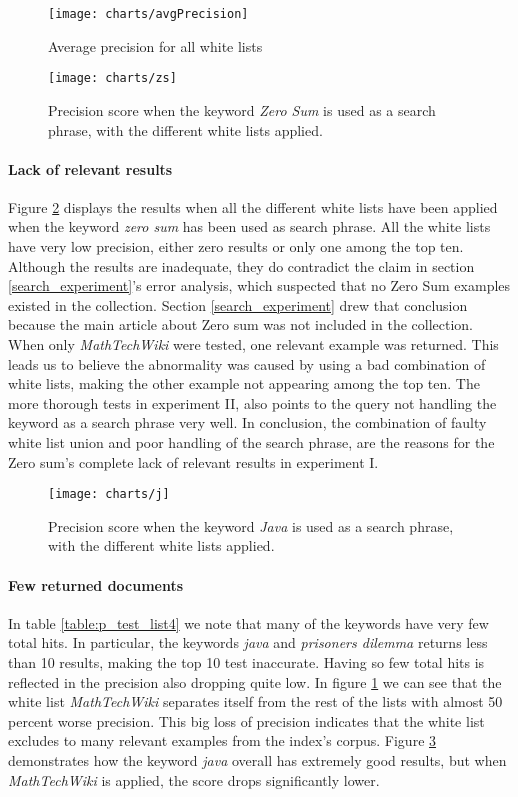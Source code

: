 \begin{figure}[H] 
\caption{Average precision for all white lists}
\texttt{[image: charts/avgPrecision]}
\label{fig:avgPrecision}
\end{figure}

\begin{figure}[h] 
\caption{Precision score when the keyword \textit{Zero Sum} is used as a search phrase, with the different white lists applied.}
\texttt{[image: charts/zs]}
\label{fig:zs}
\end{figure}

\paragraph{Lack of relevant results}
Figure \ref{fig:zs} displays the results when all the different white lists have been applied when the keyword \textit{zero sum} has been used as search phrase. All the white lists have very low precision, either zero results or only one among the top ten. Although the results are inadequate, they do contradict the claim in section \ref{search_experiment}'s error analysis, which suspected that no Zero Sum examples existed in the collection. Section \ref{search_experiment} drew that conclusion because the main article about Zero sum was not included in the collection. When only \textit{MathTechWiki} were tested, one relevant example was returned. This leads us to believe the abnormality was caused by using a bad combination of white lists, making the other example not appearing among the top ten. The more thorough tests in experiment II, also points to the query not handling the keyword as a search phrase very well. In conclusion, the combination of faulty white list union and poor handling of the search phrase, are the reasons for the Zero sum's complete lack of relevant results in experiment I.

\begin{figure}[h] 
\caption{Precision score when the keyword \textit{Java} is used as a search phrase, with the different white lists applied.}
\texttt{[image: charts/j]}
\label{fig:j}
\end{figure}

\paragraph{Few returned documents}
In table \ref{table:p_test_list4} we note that many of the keywords have very few total hits. In particular, the keywords \textit{java} and \textit{prisoners dilemma} returns less than 10 results, making the top 10 test inaccurate. Having so few total hits is reflected in the precision also dropping quite low. In figure \ref{fig:avgPrecision} we can see that the white list \textit{MathTechWiki} separates itself from the rest of the lists with almost 50 percent worse precision. This big loss of precision indicates that the white list excludes to many relevant examples from the index's corpus. Figure \ref{fig:j} demonstrates how the keyword \textit{java} overall has extremely good results, but when \textit{MathTechWiki} is applied, the score drops significantly lower.


